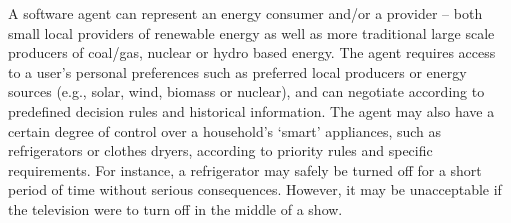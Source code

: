 A software agent can represent an energy consumer and/or
a provider -- both small local providers of renewable energy as
well as more traditional large scale producers of coal/gas, nuclear or
hydro based energy. %
The agent requires access to a user's personal preferences such as preferred local
  producers or energy sources (e.g., solar, wind, biomass or
  nuclear), and can negotiate according to predefined decision rules and historical information. 
%
The agent may also have a certain degree of control over a household's `smart' appliances, such as refrigerators or
clothes dryers, according to priority rules and specific requirements.
For instance, a refrigerator may safely be turned off for a short
period of time without serious consequences. However, it may be unacceptable if
the television were to turn off in the middle of a show.
% 

